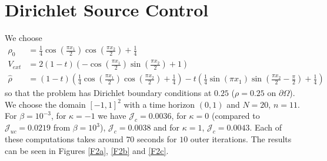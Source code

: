 \documentclass[11pt, a4paper]{article}
\theoremstyle{definition}
\newcommand{\hr}{\widehat \rho}
\begin{document}
	\section{Dirichlet Source Control}
	We choose 
	\begin{align*}
		\rho_0 &= \frac{1}{4}\cos\left(\frac{\pi x_1}{2}\right)\cos\left(\frac{\pi x_2}{2}\right) + \frac{1}{4}\\
		V_{ext} &=  2(1-t)\left(-\cos\left(\frac{\pi x_1}{2}\right)\sin\left(\frac{\pi x_2}{2}\right) + 1\right)\\
		\hr &= (1 - t)\left(\frac{1}{4}\cos\left(\frac{\pi x_1}{2}\right)\cos\left(\frac{\pi x_2}{2}\right) + \frac{1}{4}\right) - t\left(\frac{1}{4}\sin\left(\pi x_1\right)\sin\left(\frac{\pi x_2}{2} - \frac{\pi}{2}\right) + \frac{1}{4}\right)
	\end{align*}
	so that the problem has Dirichlet boundary conditions at $0.25$ ($\rho = 0.25$ on $\partial \Omega$).
	We choose the domain $[-1,1]^2$ with a time horizon $(0,1)$ and $N = 20$, $n = 11$.
	For $\beta = 10^{-3}$, for $\kappa = -1$ we have $\mathcal J_c = 0.0036$, for $\kappa = 0$ (compared to $\mathcal J_{uc} = 0.0219$ from $\beta = 10^3$), $\mathcal J_c = 0.0038$ and for $\kappa = 1$, $\mathcal J_c = 0.0043$. Each of these computations takes around $70$ seconds for $10$ outer iterations. The results can be seen in Figures \ref{F2a}, \ref{F2b} and \ref{F2c}.\\
	
\end{document}
